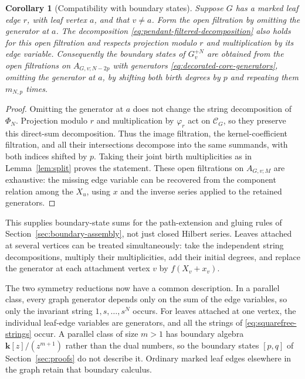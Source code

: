 \documentclass[reqno]{article}
\theoremstyle{plain} %
\newtheorem{corollary}[theorem]{Corollary}
\theoremstyle{definition}
\theoremstyle{remark}
\newcommand{\K} {\mathbf{k}}
\newcommand {\CC}{\mathscr{C}}
\numberwithin{equation}{section}
\begin{document}
\begin{corollary}[Compatibility with boundary states]
\label{cor:pendant-boundary}
Suppose $G$ has a marked leaf edge $r$, with leaf vertex $a$, and that
$v\ne a$. Form the open filtration by omitting the generator at $a$.
The decomposition \eqref{eq:pendant-filtered-decomposition} also holds
for this open filtration and respects projection modulo $r$ and
multiplication by its edge variable. Consequently the boundary states
of $G_v^{+N}$ are obtained from the open filtrations on $A_{G,v;N-2p}$
with generators \eqref{eq:decorated-core-generators}, omitting the
generator at $a$,
by shifting both birth degrees by $p$ and repeating them $m_{N,p}$ times.
\end{corollary}
\begin{proof}
Omitting the generator at $a$ does not change the string decomposition
of $\Phi_N$. Projection modulo $r$ and multiplication by $\varphi_r$
act on $\CC_G$, so they preserve this direct-sum decomposition.
Thus the image filtration, the kernel-coefficient filtration, and all
their intersections decompose into the same summands, with both
indices shifted by $p$. Taking their joint birth multiplicities as in
Lemma~\ref{lem:split} proves the statement.
These open filtrations on $A_{G,v;M}$ are exhaustive: the missing edge
variable can be recovered from the component relation among the $X_u$,
using $x$ and the inverse series applied to the retained generators.
\end{proof}

This supplies boundary-state sums for the path-extension and gluing rules
of Section~\ref{sec:boundary-assembly}, not just closed Hilbert series.
Leaves attached at several vertices can be treated simultaneously:
take the independent string decompositions, multiply their multiplicities,
add their initial degrees, and replace the generator at each attachment
vertex $v$ by $f(X_v+x_v)$.

The two symmetry reductions now have a common description. In a
parallel class, every graph generator depends only on the sum of the
edge variables, so only the invariant string $1,s,\ldots,s^N$ occurs.
For leaves attached at one vertex, the individual leaf-edge variables
are generators, and all the strings of \eqref{eq:squarefree-strings} occur.
A parallel class of size $m>1$ has boundary algebra
$\K[z]/(z^{m+1})$ rather than the dual numbers, so the boundary states
$[p,q]$ of Section~\ref{sec:proofs} do not describe it. Ordinary marked
leaf edges elsewhere in the graph retain that boundary calculus.
\end{document}
